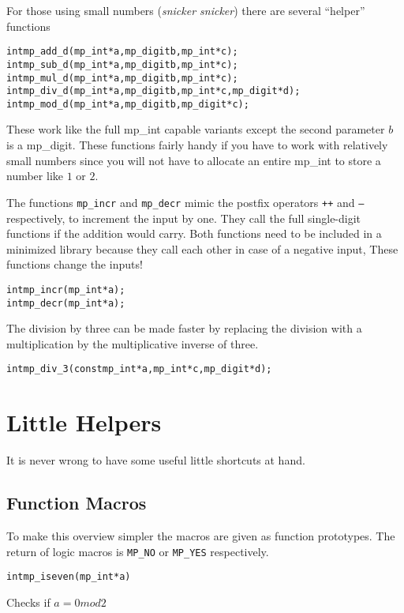 \documentclass[synpaper]{book}
\begin{document}
For those using small numbers (\textit{snicker snicker}) there are several ``helper'' functions

    
\begin{alltt}
int mp_add_d(mp_int *a, mp_digit b, mp_int *c);
int mp_sub_d(mp_int *a, mp_digit b, mp_int *c);
int mp_mul_d(mp_int *a, mp_digit b, mp_int *c);
int mp_div_d(mp_int *a, mp_digit b, mp_int *c, mp_digit *d);
int mp_mod_d(mp_int *a, mp_digit b, mp_digit *c);
\end{alltt}

These work like the full mp\_int capable variants except the second parameter $b$ is a mp\_digit.  These
functions fairly handy if you have to work with relatively small numbers since you will not have to allocate
an entire mp\_int to store a number like $1$ or $2$.

The functions \texttt{mp\_incr} and \texttt{mp\_decr} mimic the postfix operators \texttt{++} and \texttt{--} respectively, to increment the input by one. They call the full single-digit functions if the addition would carry. Both functions need to be included in a minimized library because they call each other in case of a negative input, These functions change the inputs!
\begin{alltt}
int mp_incr(mp_int *a);
int mp_decr(mp_int *a);
\end{alltt}


The division by three can be made faster by replacing the division with a multiplication by the multiplicative inverse of three.

\begin{alltt}
int mp_div_3(const mp_int *a, mp_int *c, mp_digit *d);
\end{alltt}

\chapter{Little Helpers}
It is never wrong to have some useful little shortcuts at hand.
\section{Function Macros}
To make this overview simpler the macros are given as function prototypes. The return of logic macros is \texttt{MP\_NO} or \texttt{MP\_YES} respectively.

\begin{alltt}
int mp_iseven(mp_int *a)
\end{alltt}
Checks if $a = 0 mod 2$
\end{document}
